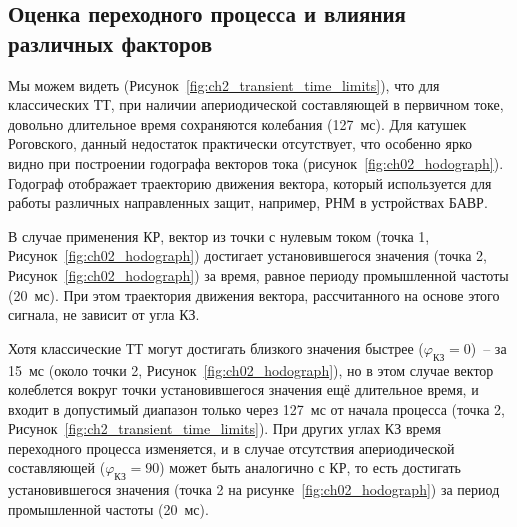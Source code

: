\subsection{Оценка переходного процесса и влияния различных факторов}
\label{sec:ch02_transient_and_harmonics}

Мы можем видеть (Рисунок~\ref{fig:ch2_transient_time_limits}), что для классических ТТ,
при наличии апериодической составляющей в первичном токе, довольно длительное время
сохраняются колебания (127~мс). Для катушек Роговского, данный недостаток практически
отсутствует, что особенно ярко видно при построении годографа векторов тока
(рисунок~\ref{fig:ch02_hodograph}). Годограф отображает траекторию движения вектора,
который используется для работы различных направленных защит, например, РНМ в
устройствах БАВР.

В случае применения КР, вектор из точки с нулевым током (точка 1,
Рисунок~\ref{fig:ch02_hodograph}) достигает установившегося значения (точка 2,
Рисунок~\ref{fig:ch02_hodograph}) за время, равное периоду промышленной частоты (20~мс).
При этом траектория движения вектора, рассчитанного на основе этого сигнала, не зависит
от угла КЗ.

Хотя классические ТТ могут достигать близкого значения быстрее ($\varphi_{\text{КЗ}} = 0$)~-- за 15~мс (около точки 2, Рисунок~\ref{fig:ch02_hodograph}), но в этом случае вектор колеблется вокруг точки установившегося значения ещё длительное время, и входит в допустимый диапазон только через 127~мс от начала процесса (точка 2, Рисунок~\ref{fig:ch2_transient_time_limits}). При других углах КЗ время переходного процесса изменяется, и в случае отсутствия апериодической составляющей ($\varphi_{\text{КЗ}} = 90$) может быть аналогично с КР, то есть достигать установившегося значения (точка 2 на рисунке~\ref{fig:ch02_hodograph}) за период промышленной частоты (20~мс).

